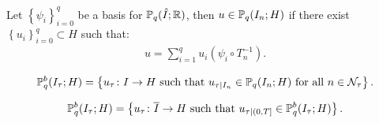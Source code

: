 Let $\left\{ \psi_i \right\}_{i = 0}^q$ be a basis for $\mathbb{P}_{q}(\hat{I}; \mathbb{R})$, then $u \in \mathbb{P}_{q}(I_n; H)$ if there exist $\left\{ u_i \right\}_{i = 0}^q \subset H$ such that:
\begin{gather}
    u = \sum_{i = 1}^q u_i (\psi_i \circ T_n^{-1}).
\end{gather}

\begin{definition}[$\Pk{q}^b(I_{\tau}; H)$]
    \begin{gather}
        \mathbb{P}_{q}^b(I_{\tau}; H) = \left\{ u_{\tau} \colon I \rightarrow H \text{ such that } u_{\tau \mid I_n} \in \mathbb{P}_{q}(I_n; H) \text{ for all } n \in \mathcal{N}_{\tau} \right\}.
    \end{gather}
\end{definition}

\begin{definition}
    \begin{gather}
        \mathbb{P}_{q}^b(I_{\tau}; H) = \left\{ u_{\tau} \colon \overline{I} \rightarrow H \text{ such that } u_{\tau \mid (0, T]} \in \mathbb{P}_{q}^b(I_{\tau}; H) \right\}.
    \end{gather}
\end{definition}